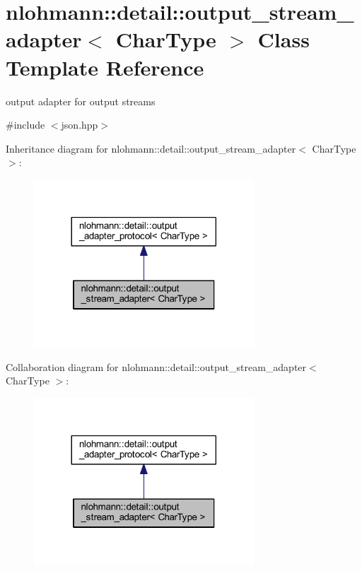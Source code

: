 \hypertarget{classnlohmann_1_1detail_1_1output__stream__adapter}{}\section{nlohmann\+::detail\+::output\+\_\+stream\+\_\+adapter$<$ Char\+Type $>$ Class Template Reference}
\label{classnlohmann_1_1detail_1_1output__stream__adapter}


output adapter for output streams  




{\ttfamily \#include $<$json.\+hpp$>$}



Inheritance diagram for nlohmann\+::detail\+::output\+\_\+stream\+\_\+adapter$<$ Char\+Type $>$\+:
\nopagebreak
\begin{figure}[H]
\begin{center}
\leavevmode
\includegraphics[width=233pt]{classnlohmann_1_1detail_1_1output__stream__adapter__inherit__graph}
\end{center}
\end{figure}


Collaboration diagram for nlohmann\+::detail\+::output\+\_\+stream\+\_\+adapter$<$ Char\+Type $>$\+:
\nopagebreak
\begin{figure}[H]
\begin{center}
\leavevmode
\includegraphics[width=233pt]{classnlohmann_1_1detail_1_1output__stream__adapter__coll__graph}
\end{center}
\end{figure}

